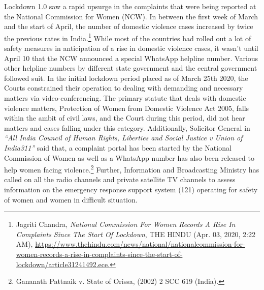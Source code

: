 \begin{multicols}{2}
\noi
Lockdown 1.0 saw a rapid upsurge in the complaints that were being reported at the National
Commission for Women (NCW). In between the first week of March and the start of April,
the number of domestic violence cases increased by twice the previous rates in India.\footnote{Jagriti Chandra, \textit{National Commission For Women Records A Rise In Complaints Since The Start Of
Lockdown}, THE HINDU (Apr. 03, 2020, 2:22 AM), \url{https://www.thehindu.com/news/national/nationalcommission-for-women-records-a-rise-in-complaints-since-the-start-of-lockdown/article31241492.ece.}} While
most of the countries had rolled out a lot of safety measures in anticipation of a rise in
domestic violence cases, it wasn’t until April 10 that the NCW announced a special
WhatsApp helpline number. Various other helpline numbers by different state government
and the central government followed suit. In the initial lockdown period placed as of March
25th 2020, the Courts constrained their operation to dealing with demanding and necessary
matters via video-conferencing. The primary statute that deals with domestic violence
matters, Protection of Women from Domestic Violence Act 2005, falls within the ambit of
civil laws, and the Court during this period, did not hear matters and cases falling under this
category. Additionally, Solicitor General in \textit{“All India Council of Human Rights, Liberties
and Social Justice v Union of India311”} said that, a complaint portal has been started by the
National Commission of Women as well as a WhatsApp number has also been released to
help women facing violence.\footnote{Gananath Pattnaik v. State of Orissa, (2002) 2 SCC 619 (India).} Further, Information and Broadcasting Ministry has called on
all the radio channels and private satellite TV channels to assess information on the
emergency response support system (121) operating for safety of women and women in
difficult situation. 


\end{multicols}
